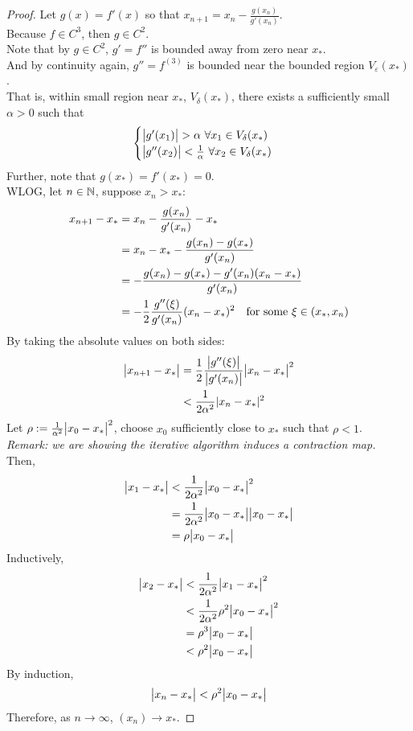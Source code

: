 \documentclass{article}
\begin{document}
	\begin{proof}
		Let $g(x) = f'(x)$ so that $x_{n+1} = x_n - \frac{g(x_n)}{g'(x_n)}$.\\
		Because $f \in C^3$, then $g \in C^2$. \\
		Note that by $g \in C^2$, $g' = f''$ is bounded away from zero near $x_*$. \\
		And by continuity again, $g'' = f^{(3)}$ is bounded near the bounded region $V_\varepsilon(x_*)$. \\
		That is, within small region near $x_*$, $V_\delta(x_*)$, there exists a sufficiently small $\alpha >0$ such that
		\begin{align}
			\begin{cases}
				\big \vert {g'(x_1)} \big \vert > \alpha\ \forall x_1 \in V_\delta(x_*) \\
				\big \vert {g''(x_2)} \big \vert < \frac{1}{\alpha}\ \forall x_2 \in V_\delta(x_*)
			\end{cases}
		\end{align}
		Further, note that $g(x_*) = f'(x_*) = 0$. \\
		WLOG, let $n \in \mathbb{N}$, suppose $x_n > x_*$:
		\begin{align}
			x_{n+1} - x_* &= x_n - \frac{g(x_n)}{g'(x_n)} - x_* \\
			&= x_n - x_* - \frac{g(x_n) - g(x_*)}{g'(x_n)} \\
			&= - \frac{g(x_n) - g(x_*) - g'(x_n)(x_n - x_*)}{g'(x_n)} \\
			&= - \frac{1}{2} \frac{g''(\xi)}{g'(x_n)} (x_n - x_*)^2\quad \text{{for some }} \xi \in (x_*, x_n)
		\end{align}
		By taking the absolute values on both sides:
		\begin{align}
			\big \vert {x_{n+1} - x_*} \big \vert &= \frac{1}{2} \frac{\big \vert {g''(\xi)} \big \vert}{\big \vert {g'(x_n)} \big \vert} \big \vert {x_n - x_*} \big \vert^2 \\
			&< \frac{1}{2 \alpha^2} |x_n - x_*|^2
		\end{align}
		Let $\rho := \frac{1}{\alpha^2} \big \vert {x_0 - x_*} \big \vert^2$, choose $x_0$ sufficiently close to $x_*$ such that $\rho < 1$.\\
		\emph{Remark: we are showing the iterative algorithm induces a contraction map.} \\
		Then,
		\begin{align}
			\big \vert {x_1 - x_*} \big \vert &< \frac{1}{2\alpha^2}\big \vert {x_0 - x_*} \big \vert^2 \\
			&= \frac{1}{2\alpha^2}\big \vert {x_0 - x_*} \big \vert \big \vert {x_0 - x_*} \big \vert \\
			&= \rho \big \vert {x_0 - x_*} \big \vert
		\end{align}
		Inductively,
		\begin{align}
			\big \vert {x_2 - x_*} \big \vert &< \frac{1}{2 \alpha^2} \big \vert {x_1 - x_*} \big \vert^2 \\
			&< \frac{1}{2 \alpha^2} \rho^2 \big \vert {x_0 - x_*} \big \vert^2 \\
			&= \rho^3 \big \vert {x_0 - x_*} \big \vert \\
			&< \rho^2 \big \vert {x_0 - x_*} \big \vert
		\end{align}
		By induction,
		\begin{align}
			\big \vert {x_n - x_*} \big \vert < \rho^2 \big \vert {x_0 - x_*} \big \vert
		\end{align}
		Therefore, as $n \to \infty$, $(x_n) \to x_*$.
	\end{proof}
	
\end{document}
